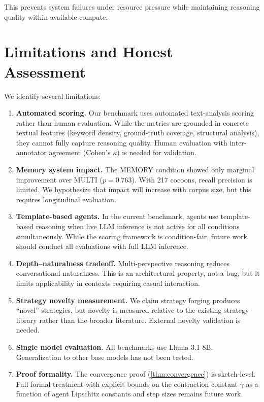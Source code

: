 \documentclass[11pt,a4paper]{article}
\begin{document}
This prevents system failures under resource pressure while maintaining reasoning quality within available compute.

\section{Limitations and Honest Assessment}
\label{sec:limitations}

We identify several limitations:

\begin{enumerate}[leftmargin=*]
  \item \textbf{Automated scoring.} Our benchmark uses automated text-analysis scoring rather than human evaluation. While the metrics are grounded in concrete textual features (keyword density, ground-truth coverage, structural analysis), they cannot fully capture reasoning quality. Human evaluation with inter-annotator agreement (Cohen's $\kappa$) is needed for validation.

  \item \textbf{Memory system impact.} The MEMORY condition showed only marginal improvement over MULTI ($p = 0.763$). With 217 cocoons, recall precision is limited. We hypothesize that impact will increase with corpus size, but this requires longitudinal evaluation.

  \item \textbf{Template-based agents.} In the current benchmark, agents use template-based reasoning when live LLM inference is not active for all conditions simultaneously. While the scoring framework is condition-fair, future work should conduct all evaluations with full LLM inference.

  \item \textbf{Depth--naturalness tradeoff.} Multi-perspective reasoning reduces conversational naturalness. This is an architectural property, not a bug, but it limits applicability in contexts requiring casual interaction.

  \item \textbf{Strategy novelty measurement.} We claim strategy forging produces ``novel'' strategies, but novelty is measured relative to the existing strategy library rather than the broader literature. External novelty validation is needed.

  \item \textbf{Single model evaluation.} All benchmarks use Llama 3.1 8B. Generalization to other base models has not been tested.

  \item \textbf{Proof formality.} The convergence proof (\cref{thm:convergence}) is sketch-level. Full formal treatment with explicit bounds on the contraction constant $\gamma$ as a function of agent Lipschitz constants and step sizes remains future work.
\end{enumerate}
\end{document}

